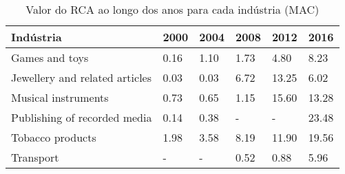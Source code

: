 \begin{table}
\centering
\caption{Valor do RCA ao longo dos anos para cada indústria (MAC)}
\label{tab:ex3-tempo-MAC}
\begin{tabular}{p{6cm}p{1.5cm}p{1.5cm}p{1.5cm}p{1.5cm}p{1.5cm}}
\toprule
                     Indústria & 2000 & 2004 & 2008 &  2012 &  2016 \\
\midrule
                Games and toys & 0.16 & 1.10 & 1.73 &  4.80 &  8.23 \\
Jewellery and related articles & 0.03 & 0.03 & 6.72 & 13.25 &  6.02 \\
           Musical instruments & 0.73 & 0.65 & 1.15 & 15.60 & 13.28 \\
  Publishing of recorded media & 0.14 & 0.38 &    - &     - & 23.48 \\
              Tobacco products & 1.98 & 3.58 & 8.19 & 11.90 & 19.56 \\
                     Transport &    - &    - & 0.52 &  0.88 &  5.96 \\
\bottomrule
\end{tabular}
\end{table}
